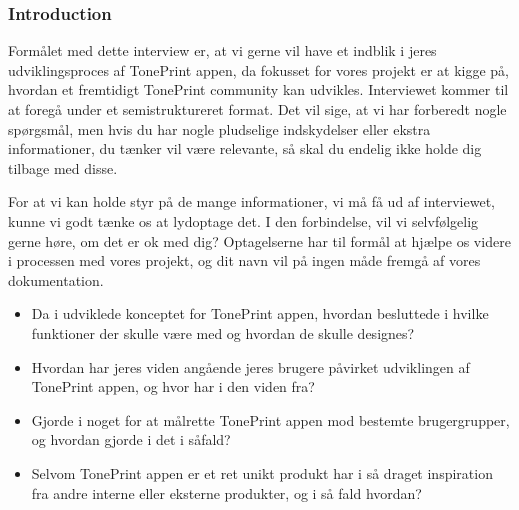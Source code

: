 \subsubsection{Introduction}
Formålet med dette interview er, at vi gerne vil have et indblik i jeres udviklingsproces af TonePrint appen, da fokusset for vores projekt er at kigge på, hvordan et fremtidigt TonePrint community kan udvikles. Interviewet kommer til at foregå under et semistruktureret format. Det vil sige, at vi har forberedt nogle spørgsmål, men hvis du har nogle pludselige indskydelser eller ekstra informationer, du tænker vil være relevante, så skal du endelig ikke holde dig tilbage med disse.

For at vi kan holde styr på de mange informationer, vi må få ud af interviewet, kunne vi godt tænke os at lydoptage det. I den forbindelse, vil vi selvfølgelig gerne høre, om det er ok med dig? Optagelserne har til formål at hjælpe os videre i processen med vores projekt, og dit navn vil på ingen måde fremgå af vores dokumentation.

\begin{itemize}
  \item Da i udviklede konceptet for TonePrint appen, hvordan besluttede i hvilke funktioner der skulle være med og hvordan de skulle designes?\\
  \item Hvordan har jeres viden angående jeres brugere påvirket udviklingen af TonePrint appen, og hvor har i den viden fra?\\
  \item Gjorde i noget for at målrette TonePrint appen mod bestemte brugergrupper, og hvordan gjorde i det i såfald?\\
  \item Selvom TonePrint appen er et ret unikt produkt har i så draget inspiration fra andre interne eller eksterne produkter, og i så fald hvordan?\\
\end{itemize}

